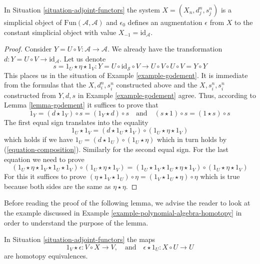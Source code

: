 \begin{lemma}
\label{lemma-standard-simplicial}
In Situation \ref{situation-adjoint-functors}
the system $X = (X_n, d^n_j, s^n_j)$
is a simplicial object of $\text{Fun}(\mathcal{A}, \mathcal{A})$
and $\epsilon_0$ defines an augmentation $\epsilon$ from $X$
to the constant simplicial object with value $X_{-1} = \text{id}_\mathcal{A}$.
\end{lemma}

\begin{proof}
Consider $Y = U \circ V : \mathcal{A} \to \mathcal{A}$.
We already have the transformation
$d : Y = U \circ V \to \text{id}_\mathcal{A}$. Let us denote
$$
s = 1_U \star \eta \star 1_V :
Y = U \circ \text{id}_\mathcal{S} \circ V
\longrightarrow
U \circ V \circ U \circ V = Y \circ Y
$$
This places us in the situation of Example \ref{example-godement}.
It is immediate from the formulas that
the $X, d^n_i, s^n_i$ constructed above and the
$X, s^n_i, s^n_i$ constructed from $Y, d, s$
in Example \ref{example-godement} agree. Thus, according to
Lemma \ref{lemma-godement} it suffices to prove that
$$
1_Y = (d \star 1_Y) \circ s = (1_Y \star d) \circ s
\quad\text{and}\quad
(s \star 1) \circ s = (1 \star s) \circ s
$$
The first equal sign translates into the equality
$$
1_U \star 1_V = (d \star 1_U \star 1_V) \circ (1_U \star \eta \star 1_V)
$$
which holds if we have $1_U = (d \star 1_U) \circ (1_U \star \eta)$
which in turn holds by (\ref{equation-composition}). Similarly for the
second equal sign. For the last equation we need to prove
$$
(1_U \star \eta \star 1_V \star 1_U \star 1_V) \circ
(1_U \star \eta \star 1_V) =
(1_U \star 1_V \star 1_U \star \eta \star 1_V) \circ
(1_U \star \eta \star 1_V)
$$
For this it suffices to prove
$(\eta \star 1_V \star 1_U) \circ \eta = (1_V \star 1_U \star \eta) \circ \eta$
which is true because both sides are the same as $\eta \star \eta$.
\end{proof}

\noindent
Before reading the proof of the following lemma, we advise the
reader to look at the example discussed in
Example \ref{example-polynomial-algebra-homotopy}
in order to understand the purpose of the lemma.

\begin{lemma}
\label{lemma-standard-simplicial-homotopy}
In Situation \ref{situation-adjoint-functors} the maps
$$
1_V \star \epsilon : V \circ X \to V,
\quad\text{and}\quad
\epsilon \star 1_U : X \circ U \to U
$$
are homotopy equivalences.
\end{lemma}

